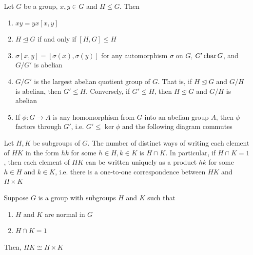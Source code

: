\begin{proposition}
	Let $G$ be a group, $x, y \in G$ and $H \leq G$. Then
	\begin{enumerate}
		\item $xy = yx[x, y]$
		\item $H \trianglelefteq G$ if and only if $[H, G] \leq H$
		\item $\sigma[x, y] = [\sigma(x), \sigma(y)]$ for any automorphism $\sigma$ on $G$, $G' \operatorname{char} G$, and $G / G'$ is abelian
		\item $G / G'$ is the largest abelian quotient group of $G$. That is, if $H \trianglelefteq G$ and $G / H$ is abelian, then $G' \leq H$. Conversely, if $G' \leq H$, then $H \trianglelefteq G$ and $G / H$ is abelian
		\item If $\phi: G \to A$ is any homomorphism from $G$ into an abelian group $A$, then $\phi$ factors through $G'$, i.e. $G' \leq \ker \phi$ and the following diagram commutes
		\begin{center}
		\end{center}
	\end{enumerate}
\end{proposition}

\begin{proposition}
	Let $H, K$ be subgroups of $G$. The number of distinct ways of writing each element of $HK$ in the form $hk$ for some $h \in H, k \in K$ is $H \cap K$. In particular, if $H \cap K = 1$, then each element of $HK$ can be written uniquely as a product $hk$ for some $h \in H$ and $k \in K$, i.e. there is a one-to-one correspondence between $HK$ and $H \times K$
\end{proposition}

\begin{theorem}
	Suppose $G$ is a group with subgroups $H$ and $K$ such that 
	\begin{enumerate}
		\item $H$ and $K$ are normal in $G$
		\item $H \cap K = 1$
	\end{enumerate}
	Then, $HK \cong H \times K$
\end{theorem}


